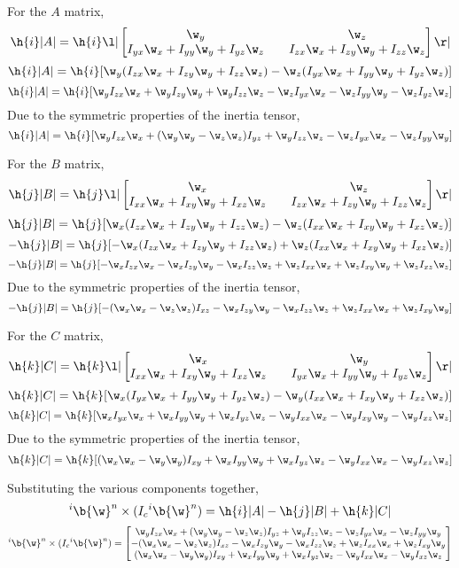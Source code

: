 \documentclass[a4paper, 12pt]{report}
\begin{document}
\begin{center}
For the $A$ matrix,
$$\h{i}|A| = \h{i}\l|\begin{bmatrix}
\w_y && \w_z \\
I_{yx}\w_x + I_{yy}\w_y + I_{yz}\w_z && I_{zx}\w_x + I_{zy}\w_y + I_{zz}\w_z
\end{bmatrix}\r|$$
$$\h{i}|A| = \h{i}[\w_y(I_{zx}\w_x + I_{zy}\w_y + I_{zz}\w_z) - \w_z(I_{yx}\w_x + I_{yy}\w_y + I_{yz}\w_z)]$$
$$\h{i}|A| = \h{i}[\w_yI_{zx}\w_x + \w_yI_{zy}\w_y + \w_yI_{zz}\w_z - \w_zI_{yx}\w_x - \w_zI_{yy}\w_y - \w_zI_{yz}\w_z]$$
Due to the symmetric properties of the inertia tensor,
$$\h{i}|A| = \h{i}[\w_yI_{zx}\w_x + (\w_y\w_y - \w_z\w_z)I_{yz} + \w_yI_{zz}\w_z - \w_zI_{yx}\w_x - \w_zI_{yy}\w_y]$$

For the $B$ matrix,
$$\h{j}|B| = \h{j}\l|\begin{bmatrix}
\w_x && \w_z \\
I_{xx}\w_x + I_{xy}\w_y + I_{xz}\w_z && I_{zx}\w_x + I_{zy}\w_y + I_{zz}\w_z
\end{bmatrix}\r|$$
$$\h{j}|B| = \h{j}[\w_x(I_{zx}\w_x + I_{zy}\w_y + I_{zz}\w_z) - \w_z(I_{xx}\w_x + I_{xy}\w_y + I_{xz}\w_z)]$$
$$-\h{j}|B| = \h{j}[-\w_x(I_{zx}\w_x + I_{zy}\w_y + I_{zz}\w_z) + \w_z(I_{xx}\w_x + I_{xy}\w_y + I_{xz}\w_z)]$$
$$-\h{j}|B| = \h{j}[-\w_xI_{zx}\w_x - \w_xI_{zy}\w_y - \w_xI_{zz}\w_z + \w_zI_{xx}\w_x + \w_zI_{xy}\w_y + \w_zI_{xz}\w_z]$$
Due to the symmetric properties of the inertia tensor,
$$-\h{j}|B| = \h{j}[-(\w_x\w_x - \w_z\w_z)I_{xz} - \w_xI_{zy}\w_y - \w_xI_{zz}\w_z + \w_zI_{xx}\w_x + \w_zI_{xy}\w_y]$$

For the $C$ matrix,
$$\h{k}|C| = \h{k}\l|\begin{bmatrix}
\w_x && \w_y \\
I_{xx}\w_x + I_{xy}\w_y + I_{xz}\w_z && I_{yx}\w_x + I_{yy}\w_y + I_{yz}\w_z
\end{bmatrix}\r|$$
$$\h{k}|C| = \h{k}[\w_x(I_{yx}\w_x + I_{yy}\w_y + I_{yz}\w_z) - \w_y(I_{xx}\w_x + I_{xy}\w_y + I_{xz}\w_z)]$$
$$\h{k}|C| = \h{k}[\w_xI_{yx}\w_x + \w_xI_{yy}\w_y + \w_xI_{yz}\w_z - \w_yI_{xx}\w_x  - \w_yI_{xy}\w_y  - \w_yI_{xz}\w_z]$$
Due to the symmetric properties of the inertia tensor,
$$\h{k}|C| = \h{k}[(\w_x\w_x - \w_y\w_y)I_{xy} + \w_xI_{yy}\w_y + \w_xI_{yz}\w_z - \w_yI_{xx}\w_x  - \w_yI_{xz}\w_z]$$

Substituting the various components together,
$${}^i\b{\w}^n\times (I_c {}^i\b{\w}^n) = \h{i}|A| - \h{j}|B| + \h{k}|C|$$
$${}^i\b{\w}^n\times (I_c {}^i\b{\w}^n) = \begin{bmatrix}
\w_yI_{zx}\w_x + (\w_y\w_y - \w_z\w_z)I_{yz} + \w_yI_{zz}\w_z - \w_zI_{yx}\w_x - \w_zI_{yy}\w_y \\
-(\w_x\w_x - \w_z\w_z)I_{xz} - \w_xI_{zy}\w_y - \w_xI_{zz}\w_z + \w_zI_{xx}\w_x + \w_zI_{xy}\w_y \\
(\w_x\w_x - \w_y\w_y)I_{xy} + \w_xI_{yy}\w_y + \w_xI_{yz}\w_z - \w_yI_{xx}\w_x  - \w_yI_{xz}\w_z
\end{bmatrix}$$


\end{center}
\end{document}
